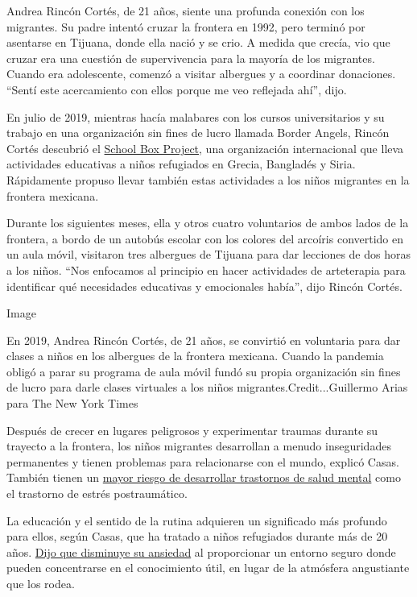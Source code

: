 Andrea Rincón Cortés, de 21 años, siente una profunda conexión con los
migrantes. Su padre intentó cruzar la frontera en 1992, pero terminó por
asentarse en Tijuana, donde ella nació y se crio. A medida que crecía,
vio que cruzar era una cuestión de supervivencia para la mayoría de los
migrantes. Cuando era adolescente, comenzó a visitar albergues y a
coordinar donaciones. ``Sentí este acercamiento con ellos porque me veo
reflejada ahí'', dijo.

En julio de 2019, mientras hacía malabares con los cursos universitarios
y su trabajo en una organización sin fines de lucro llamada Border
Angels, Rincón Cortés descubrió el
\href{https://www.schoolboxproject.org/us-mexican-border}{School Box
Project}, una organización internacional que lleva actividades
educativas a niños refugiados en Grecia, Bangladés y Siria. Rápidamente
propuso llevar también estas actividades a los niños migrantes en la
frontera mexicana.

Durante los siguientes meses, ella y otros cuatro voluntarios de ambos
lados de la frontera, a bordo de un autobús escolar con los colores del
arcoíris convertido en un aula móvil, visitaron tres albergues de
Tijuana para dar lecciones de dos horas a los niños. ``Nos enfocamos al
principio en hacer actividades de arteterapia para identificar qué
necesidades educativas y emocionales había'', dijo Rincón Cortés.

Image

En 2019, Andrea Rincón Cortés, de 21 años, se convirtió en voluntaria
para dar clases a niños en los albergues de la frontera mexicana. Cuando
la pandemia obligó a parar su programa de aula móvil fundó su propia
organización sin fines de lucro para darle clases virtuales a los niños
migrantes.Credit...Guillermo Arias para The New York Times

Después de crecer en lugares peligrosos y experimentar traumas durante
su trayecto a la frontera, los niños migrantes desarrollan a menudo
inseguridades permanentes y tienen problemas para relacionarse con el
mundo, explicó Casas. También tienen un
\href{https://oxfordre.com/publichealth/view/10.1093/acrefore/9780190632366.001.0001/acrefore-9780190632366-e-12}{mayor
riesgo de desarrollar trastornos de salud mental} como el trastorno de
estrés postraumático.

La educación y el sentido de la rutina adquieren un significado más
profundo para ellos, según Casas, que ha tratado a niños refugiados
durante más de 20 años.
\href{https://onlinelibrary.wiley.com/doi/10.1002/9780470669280.ch12}{Dijo
que disminuye su ansiedad} al proporcionar un entorno seguro donde
pueden concentrarse en el conocimiento útil, en lugar de la atmósfera
angustiante que los rodea.

